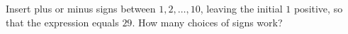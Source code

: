 Insert plus or minus signs between $1,2,\ldots,10$, leaving the initial $1$ positive, so that the expression equals $29$. How many choices of signs work?
